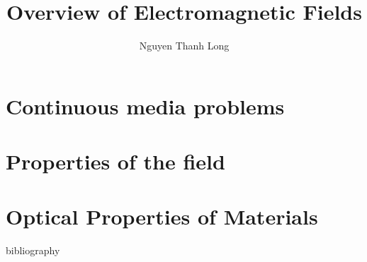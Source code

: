 \documentclass[t]{beamer}
\title{Overview of Electromagnetic Fields}
\author{Nguyen Thanh Long}
\institute{RF3i - Smart Sensor Lab}
\date{}
\begin{document}
\frame{\titlepage}

\section{Continuous media problems}











\section{Properties of the field}







\section{Optical Properties of Materials}







\begin{frame}[allowframebreaks]{bibliography}

\printbibliography

\end{frame}
\end{document}
